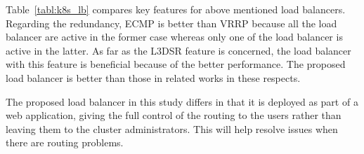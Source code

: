 \begin{table}[h]
  \centering

  \par\bigskip
  \begin{minipage}{1.0\columnwidth}
    \caption[Comparison of software load balancers for Kubernetes]{
    Comparison of software load balancers for Kubernetes. 
  $^{*}$ Conventional technology uses cloud load balancers if available, which is not necessarily container friendly. 
  $^{**}$ Metallb also supports layer 2 mode, which uses unsolicited ARP or NDP packets to update layer 2 address table in the upstream router. 
  $^{***}$ The author plans to add XDP feature in future work.
    }   
    \label{tabl:k8s_lb}
  \end{minipage}

\end{table}

Table~\ref{tabl:k8s_lb} compares key features for above mentioned load balancers.
Regarding the redundancy, ECMP is better than VRRP because all the load balancer are active in the former case whereas only one of the load balancer is active in the latter.
As far as the L3DSR feature is concerned, the load balancer with this feature is beneficial because of the better performance.
The proposed load balancer is better than those in related works in these respects.

The proposed load balancer in this study differs in that it is deployed as part of a web application, giving the full control of the routing to the users rather than leaving them to the cluster administrators.
This will help resolve issues when there are routing problems.

